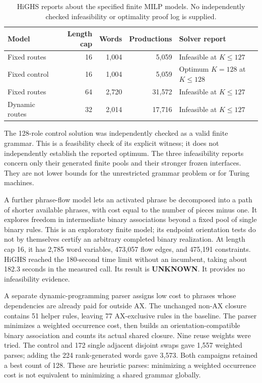 \begin{table}[htbp]
\centering\small
\begin{tabularx}{\textwidth}{@{}lrrrX@{}}
\toprule
Model & Length cap & Words & Productions & Solver report \\
\midrule
Fixed routes & 16 & 1,004 & 5,059 & Infeasible at $K\leq127$ \\
Fixed control & 16 & 1,004 & 5,059 & Optimum $K=128$ at $K\leq128$ \\
Fixed routes & 64 & 2,720 & 31,572 & Infeasible at $K\leq127$ \\
Dynamic routes & 32 & 2,014 & 17,716 & Infeasible at $K\leq127$ \\
\bottomrule
\end{tabularx}
\caption{HiGHS reports about the specified finite MILP models.  No
independently checked infeasibility or optimality proof log is supplied.}
\label{tab:grammar-milp}
\end{table}

The 128-role control solution was independently checked as a valid finite
grammar.  This is a feasibility check of its explicit witness; it does not
independently establish the reported optimum.  The three infeasibility
reports concern only their generated finite pools and their stronger
frozen interfaces.  They are not lower bounds for the unrestricted
grammar problem or for Turing machines.

A further phrase-flow model lets an activated phrase be decomposed into
a path of shorter available phrases, with cost equal to the number of
pieces minus one.  It explores freedom in intermediate binary
associations beyond a fixed pool of single binary rules.  This is an
exploratory finite model; its endpoint orientation tests do not by
themselves certify an arbitrary completed binary realization.  At length
cap 16, it has 2,785 word variables, 473,057 flow edges, and 475,191
constraints.  HiGHS reached the 180-second time limit without an
incumbent, taking about 182.3 seconds in the measured call.  Its result is
\textbf{UNKNOWN}.  It provides no infeasibility evidence.

A separate dynamic-programming parser assigns low cost to phrases whose
dependencies are already paid for outside AX.  The unchanged non-AX
closure contains 51 helper rules, leaving 77 AX-exclusive rules in the
baseline.  The parser minimizes a weighted occurrence cost, then builds
an orientation-compatible binary association and counts its actual shared
closure.  Nine reuse weights were tried.  The control and 172 single
adjacent disjoint swaps gave 1,557 weighted parses; adding the 224
rank-generated words gave 3,573.  Both campaigns retained a best count of
128.  These are heuristic parses: minimizing a weighted occurrence cost
is not equivalent to minimizing a shared grammar globally.

